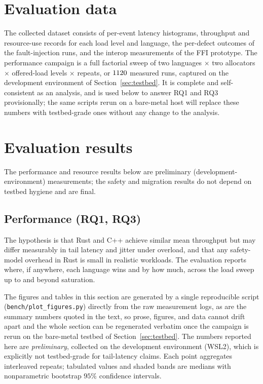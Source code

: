 \documentclass[english,twoside,openright,a4paper,censored,csm,software-track-2020]{HYthesisML}
\begin{document}
\section{Evaluation data}
The collected dataset consists of per-event latency histograms, throughput and resource-use
records for each load level and language, the per-defect outcomes of the fault-injection
runs, and the interop measurements of the FFI prototype. The performance campaign is a full
factorial sweep of two languages $\times$ two allocators $\times$ \NLoadLevels{} offered-load
levels $\times$ \NRepeats{} repeats, or $1120$ measured runs, captured on the development
environment of Section~\ref{sec:testbed}. It is complete and self-consistent as an analysis, and
is used
below to answer RQ1 and RQ3 provisionally; the same scripts rerun on a bare-metal host will
replace these numbers with testbed-grade ones without any change to the analysis.

\section{Evaluation results}
The performance and resource results below are preliminary (development-environment)
measurements; the safety and migration results do not depend on testbed hygiene and are final.

\subsection{Performance (RQ1, RQ3)}\label{sec:perfresults}
The hypothesis is that Rust and C++ achieve similar mean throughput but may differ
measurably in tail latency and jitter under overload, and that any safety-model overhead in
Rust is small in realistic workloads. The evaluation reports where, if anywhere, each
language wins and by how much, across the load sweep up to and beyond saturation.

The figures and tables in this section are generated by a single reproducible script
(\texttt{bench/plot\_figures.py}) directly from the raw measurement logs, as are the summary
numbers quoted in the text, so prose, figures, and data cannot drift apart and the whole
section can be regenerated verbatim once the campaign is rerun on the bare-metal testbed of
Section~\ref{sec:testbed}. The numbers reported here are \emph{preliminary}, collected on the
development environment (WSL2), which is explicitly not testbed-grade for tail-latency claims.
Each point aggregates \NRepeats{} interleaved repeats; tabulated values and shaded bands are
medians with nonparametric bootstrap $95\%$ confidence intervals.
\end{document}
